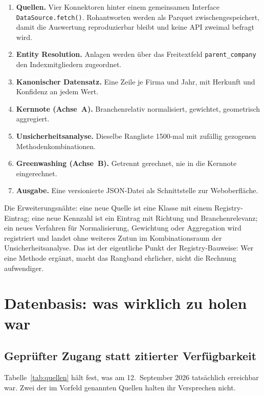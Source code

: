 \documentclass[11pt,a4paper]{article}
\begin{document}
\begin{enumerate}[label=\textbf{\arabic*.}]
\item \textbf{Quellen.} Vier Konnektoren hinter einem gemeinsamen Interface \texttt{DataSource.fetch()}. Rohantworten werden als Parquet zwischengespeichert, damit die Auswertung reproduzierbar bleibt und keine API zweimal befragt wird.
\item \textbf{Entity Resolution.} Anlagen werden über das Freitextfeld \texttt{parent\_company} den Indexmitgliedern zugeordnet.
\item \textbf{Kanonischer Datensatz.} Eine Zeile je Firma und Jahr, mit Herkunft und Konfidenz an jedem Wert.
\item \textbf{Kernnote (Achse~A).} Branchenrelativ normalisiert, gewichtet, geometrisch aggregiert.
\item \textbf{Unsicherheitsanalyse.} Dieselbe Rangliste 1500-mal mit zufällig gezogenen Methodenkombinationen.
\item \textbf{Greenwashing (Achse~B).} Getrennt gerechnet, nie in die Kernnote eingerechnet.
\item \textbf{Ausgabe.} Eine versionierte JSON-Datei als Schnittstelle zur Weboberfläche.
\end{enumerate}

Die Erweiterungsnähte: eine neue Quelle ist eine Klasse mit einem Registry-Eintrag; eine neue Kennzahl ist ein Eintrag mit Richtung und Branchenrelevanz; ein neues Verfahren für Normalisierung, Gewichtung oder Aggregation wird registriert und landet ohne weiteres Zutun im Kombinationsraum der Unsicherheitsanalyse. Das ist der eigentliche Punkt der Registry-Bauweise: Wer eine Methode ergänzt, macht das Rangband ehrlicher, nicht die Rechnung aufwendiger.

\section{Datenbasis: was wirklich zu holen war}

\subsection{Geprüfter Zugang statt zitierter Verfügbarkeit}

Tabelle~\ref{tab:quellen} hält fest, was am 12.~September 2026 tatsächlich erreichbar war. Zwei der im Vorfeld genannten Quellen halten ihr Versprechen nicht.
\end{document}

